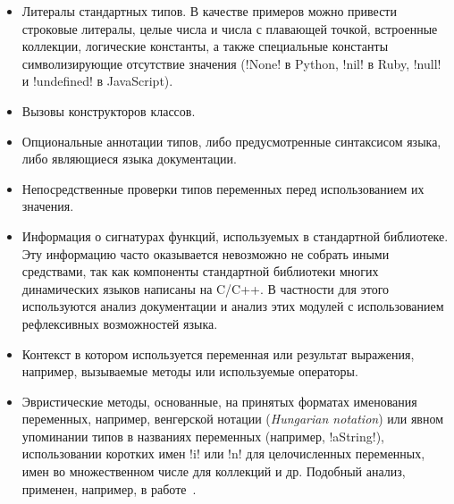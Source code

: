 \begin{itemize}
    \item{Литералы стандартных типов. В качестве примеров можно привести
        строковые литералы, целые числа и числа с плавающей точкой, встроенные
        коллекции, логические константы, а также специальные константы символизирующие
        отсутствие значения (!None! в Python, !nil! в Ruby,
        !null! и !undefined! в JavaScript).}
    \item{Вызовы конструкторов классов.}
    \item{Опциональные аннотации типов, либо предусмотренные синтаксисом языка, либо
        являющиеся языка документации.}
    \item{Непосредственные проверки типов переменных перед использованием их
        значения.}
    \item{Информация о сигнатурах функций, используемых в стандартной
        библиотеке. Эту информацию часто оказывается невозможно не собрать иными
        средствами, так как компоненты стандартной библиотеки многих
        динамических языков написаны на C/C++. В частности для этого
        используются анализ документации и анализ этих модулей с использованием
        рефлексивных возможностей языка.}
    \item{Контекст в котором используется переменная или результат выражения, 
        например, вызываемые методы или используемые операторы.}
    \item{Эвристические методы, основанные, на принятых форматах
        именования переменных, например, венгерской нотации (\emph{Hungarian
          notation}) или явном упоминании типов в названиях переменных (например,
        !aString!), использовании коротких имен !i! или !n!
        для целочисленных переменных, имен во множественном числе для коллекций
        и др. Подобный анализ, применен, например, в работе~\cite[]{Tu}.
    }
\end{itemize}
     

